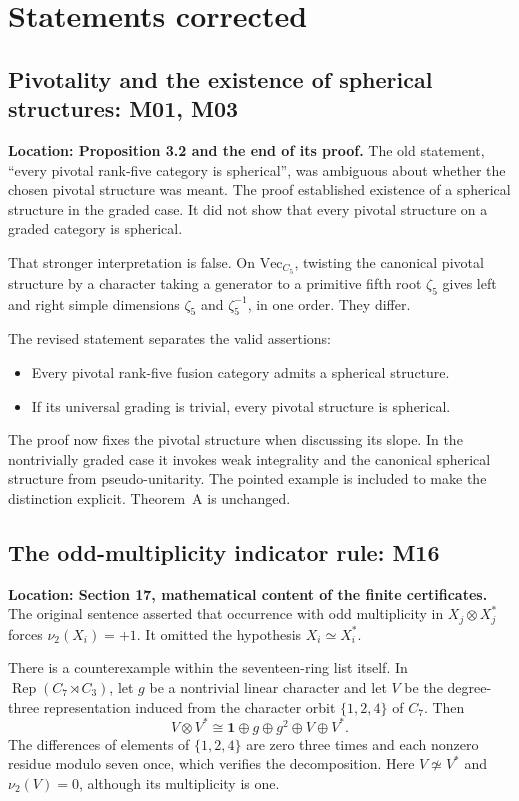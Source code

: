 \documentclass[11pt,a4paper]{article}
\begin{document}
\section{Statements corrected}

\subsection{Pivotality and the existence of spherical structures: M01, M03}

\textbf{Location: Proposition 3.2 and the end of its proof.}
The old statement, ``every pivotal rank-five category is spherical'',
was ambiguous about whether the chosen pivotal structure was meant.
The proof established existence of a spherical structure in the graded
case. It did not show that every pivotal structure on a graded category
is spherical.

That stronger interpretation is false. On $\mathrm{Vec}_{C_5}$, twisting
the canonical pivotal structure by a character taking a generator to a
primitive fifth root $\zeta_5$ gives left and right simple dimensions
$\zeta_5$ and $\zeta_5^{-1}$, in one order. They differ.

The revised statement separates the valid assertions:
\begin{itemize}
\item Every pivotal rank-five fusion category admits a spherical structure.
\item If its universal grading is trivial, every pivotal structure is spherical.
\end{itemize}
The proof now fixes the pivotal structure when discussing its slope.
In the nontrivially graded case it invokes weak integrality and the
canonical spherical structure from pseudo-unitarity. The pointed example
is included to make the distinction explicit. Theorem~A is unchanged.

\subsection{The odd-multiplicity indicator rule: M16}

\textbf{Location: Section 17, mathematical content of the finite certificates.}
The original sentence asserted that occurrence with odd multiplicity in
$X_j\otimes X_j^*$ forces $\nu_2(X_i)=+1$. It omitted the hypothesis
$X_i\simeq X_i^*$.

There is a counterexample within the seventeen-ring list itself. In
$\operatorname{Rep}(C_7\rtimes C_3)$, let $g$ be a nontrivial linear
character and let $V$ be the degree-three representation induced from
the character orbit $\{1,2,4\}$ of $C_7$. Then
\[
 V\otimes V^*\cong\mathbf1\oplus g\oplus g^2\oplus V\oplus V^*.
\]
The differences of elements of $\{1,2,4\}$ are zero three times and each
nonzero residue modulo seven once, which verifies the decomposition.
Here $V\not\simeq V^*$ and $\nu_2(V)=0$, although its multiplicity is one.
\end{document}

